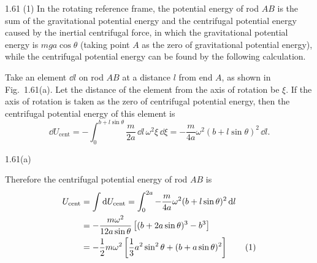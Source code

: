 \begin{solution}{1.61}
(1) In the rotating reference frame, the potential energy of rod $AB$ is the sum of the gravitational potential energy and the centrifugal potential energy caused by the inertial centrifugal force, in which the gravitational potential energy is $mga\cos\theta$ (taking point $A$ as the zero of gravitational potential energy), while the centrifugal potential energy can be found by the following calculation.

Take an element $\dd l$ on rod $AB$ at a distance $l$ from end $A$, as shown in Fig.~1.61(a). Let the distance of the element from the axis of rotation be $\xi$. If the axis of rotation is taken as the zero of centrifugal potential energy, then the centrifugal potential energy of this element is
\[
\dd U_{\text{cent}}=-\int_0^{b+l\sin\theta}\frac{m}{2a}\,\dd l\,\omega^2\xi\,\dd\xi
=-\frac{m}{4a}\omega^2(b+l\sin\theta)^2\,\dd l.
\]

\begin{figbox}{1.61(a)}
\end{figbox}

Therefore the centrifugal potential energy of rod $AB$ is
\begin{align}
U_{\text{cent}}&=\int\mathrm{d} U_{\text{cent}}=\int_0^{2a}-\frac{m}{4a}\omega^2(b+l\sin\theta)^2\,\mathrm{d} l\notag\\
&=-\frac{m\omega^2}{12a\sin\theta}\left[(b+2a\sin\theta)^3-b^3\right]\notag\\
&=-\frac{1}{2}m\omega^2\left[\frac{1}{3}a^2\sin^2\theta+(b+a\sin\theta)^2\right] \tag{1}
\end{align}


\end{solution}
